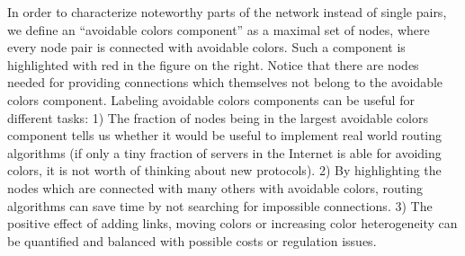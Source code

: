 \documentclass[aps, pre, twocolumn, a4paper, floatfix]{revtex4}
\begin{document}
In order to characterize noteworthy parts of the network instead of single pairs, we 
define an ``avoidable colors component'' as a maximal set of nodes, where every 
node pair is connected with avoidable colors. Such a component is highlighted with 
red in the figure on the right. Notice that there are nodes needed for providing 
connections which themselves not belong to the avoidable colors component. Labeling 
avoidable colors components can be useful for different tasks: 1) The 
fraction of nodes being in the largest avoidable colors component tells us whether 
it would be useful to implement real world routing algorithms (if only a tiny fraction of 
servers in the Internet is able for avoiding colors, it is not worth of thinking about 
new protocols). 2) By highlighting the nodes which are connected with many others with 
avoidable colors, routing algorithms can save time by not searching for impossible 
connections. 3) The positive effect of adding links, moving colors or increasing color 
heterogeneity can be quantified and balanced with possible costs or regulation issues. 
\end{document}
